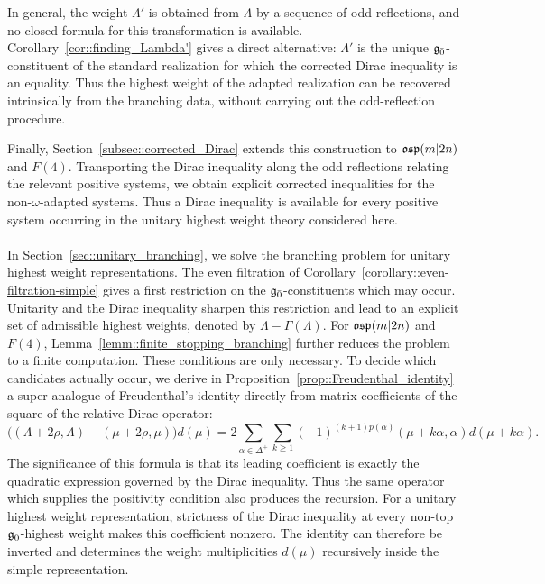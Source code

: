 In general, the weight $\Lambda'$ is obtained from $\Lambda$ by a sequence of odd reflections, and no closed formula for this transformation is available. Corollary~\ref{cor::finding_Lambda'} gives a direct alternative: $\Lambda'$ is the unique ${\mathfrak{g}_{\bar{0}}}$-constituent of the standard realization for which the corrected Dirac inequality is an equality. Thus the highest weight of the adapted realization can be recovered intrinsically from the branching data, without carrying out the odd-reflection procedure.

Finally, Section~\ref{subsec::corrected_Dirac} extends this construction to ${\mathfrak{osp}}(m\vert2n)$ and $F(4)$. Transporting the Dirac inequality along the odd reflections relating the relevant positive systems, we obtain explicit corrected inequalities for the non-$\omega$-adapted systems. Thus a Dirac inequality is available for every positive system occurring in the unitary highest weight theory considered here. 
\\ 
\\
In Section~\ref{sec::unitary_branching}, we solve the branching problem for unitary highest weight representations. The even filtration of Corollary~\ref{corollary::even-filtration-simple} gives a first restriction on the ${\mathfrak{g}_{\bar{0}}}$-constituents which may occur. Unitarity and the Dirac inequality sharpen this restriction and lead to an explicit set of admissible highest weights, denoted by $\Lambda-\Gamma(\Lambda)$. For ${\mathfrak{osp}}(m\vert2n)$ and $F(4)$, Lemma~\ref{lemm::finite_stopping_branching} further reduces the problem to a finite computation. These conditions are only necessary. To decide which candidates actually occur, we derive in Proposition~\ref{prop::Freudenthal_identity} a super analogue of Freudenthal's identity directly from matrix coefficients of the square of the relative Dirac operator:
\begin{equation}
\bigl((\Lambda+2\rho,\Lambda)-(\mu+2\rho,\mu)\bigr)d(\mu)
=
2\sum_{\alpha\in\Delta^{+}}\sum_{k\geq1}
(-1)^{(k+1)p(\alpha)}
(\mu+k\alpha,\alpha)d(\mu+k\alpha).
\end{equation}
The significance of this formula is that its leading coefficient is exactly the quadratic expression governed by the Dirac inequality. Thus the same operator which supplies the positivity condition also produces the recursion. For a unitary highest weight representation, strictness of the Dirac inequality at every non-top ${\mathfrak{g}_{\bar{0}}}$-highest weight makes this coefficient nonzero. The identity can therefore be inverted and determines the weight multiplicities $d(\mu)$ recursively inside the simple representation.

